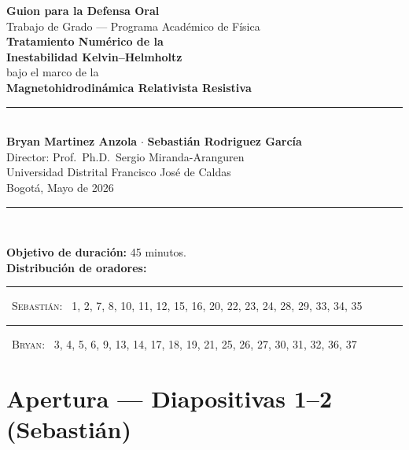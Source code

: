 \documentclass[11pt,a4paper]{article}
\begin{document}
\begin{titlepage}
\centering
\vspace*{2cm}
{\Large\bfseries\color{neutral} Guion para la Defensa Oral}\\[0.4em]
{\large Trabajo de Grado --- Programa Académico de Física}\\[1.5em]
{\Huge\bfseries Tratamiento Numérico de la}\\[0.3em]
{\Huge\bfseries Inestabilidad Kelvin--Helmholtz}\\[0.3em]
{\Large bajo el marco de la}\\[0.3em]
{\Huge\bfseries Magnetohidrodinámica Relativista Resistiva}\\[2em]

\rule{0.6\linewidth}{0.4pt}\\[1em]
{\large
  \textbf{Bryan Martinez Anzola} \quad $\cdot$ \quad
  \textbf{Sebastián Rodriguez García}\\[0.5em]
  Director: Prof.\ Ph.D.\ Sergio Miranda-Aranguren\\[0.3em]
  Universidad Distrital Francisco José de Caldas\\[0.3em]
  Bogotá, Mayo de 2026
}\\[1.5em]
\rule{0.6\linewidth}{0.4pt}\\[2em]

\begin{tcolorbox}[colback=tagbg, colframe=neutral!50, width=0.85\linewidth,
                  arc=2pt, boxrule=0.5pt]
\small
\textbf{Objetivo de duración:} 45 minutos.\\
\textbf{Distribución de oradores:}\\[0.3em]
\textcolor{seb}{\rule{0.8em}{0.8em}}\ \textsc{Sebastián}: \ 1, 2, 7, 8, 10, 11, 12, 15, 16, 20, 22, 23, 24, 28, 29, 33, 34, 35\\[0.2em]
\textcolor{bry}{\rule{0.8em}{0.8em}}\ \textsc{Bryan}: \ 3, 4, 5, 6, 9, 13, 14, 17, 18, 19, 21, 25, 26, 27, 30, 31, 32, 36, 37
\end{tcolorbox}
\vfill
\end{titlepage}

\tableofcontents
\newpage

\section{Apertura --- Diapositivas 1--2 (Sebastián)}
\end{document}
